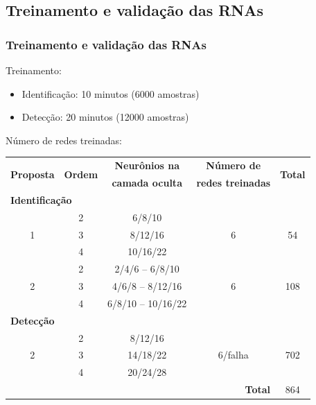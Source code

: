 \documentclass{beamer}
\begin{document}
\subsection{Treinamento e validação das RNAs}
\begin{frame}
    \frametitle{Treinamento e validação das RNAs}

    Treinamento:

\begin{itemize}
    \item Identificação: 10 minutos (6000 amostras)
    \item Detecção: 20 minutos (12000 amostras)
\end{itemize}

    Número de redes treinadas:

\begin{table}[htb]
\scriptsize
\centering
\begin{tabular}{|c|c|c|c|c|}
\hline
\multirow{2}{*}{\bf Proposta} & 
\multirow{2}{*}{\bf Ordem} & 
{\bf Neurônios na} & 
{\bf Número de} & 
\multirow{2}{*}{\bf Total}\\
& & {\bf camada oculta} & {\bf redes treinadas} &\\
\hline
\hline
\multicolumn{5}{|l|}{{\bf Identificação}}\\
\hline
\multirow{3}{*}{1} & 2 & 6/8/10 & \multirow{3}{*}{6} & \multirow{3}{*}{54}\\
\cline{2-3}
& 3 & 8/12/16 & &\\
\cline{2-3}
& 4 & 10/16/22 & &\\
\hline
\multirow{3}{*}{2} & 2 & 2/4/6 -- 6/8/10 & 
\multirow{3}{*}{6} & \multirow{3}{*}{108}\\
\cline{2-3}
& 3 & 4/6/8 -- 8/12/16 & & \\
\cline{2-3}
& 4 & 6/8/10 -- 10/16/22 & & \\
\hline
\multicolumn{5}{|l|}{{\bf Detecção}}\\
\hline
\multirow{3}{*}{2} & 2 & 8/12/16 & 
\multirow{3}{*}{6/falha} &
\multirow{3}{*}{702}\\
\cline{2-3}
& 3 & 14/18/22 & &\\
\cline{2-3}
& 4 & 20/24/28 & &\\
\hline
\hline
\multicolumn{4}{|r|}{{\bf Total}} & 864\\
\hline
\end{tabular}
\end{table}

\end{frame}
\end{document}
